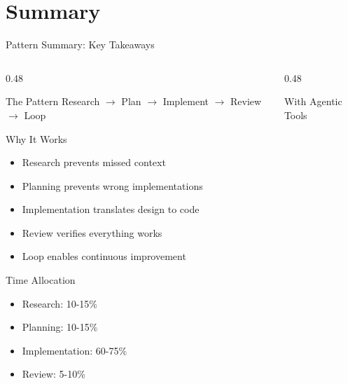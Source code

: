 \documentclass[aspectratio=169,10pt]{beamer}
\begin{document}
\section{Summary}

\begin{frame}{Pattern Summary: Key Takeaways}
    \begin{columns}[T]
        \begin{column}{0.48\textwidth}
            \begin{block}{The Pattern}
                Research $\rightarrow$ Plan $\rightarrow$ Implement $\rightarrow$ Review $\rightarrow$ Loop
            \end{block}
            \begin{block}{Why It Works}
                \begin{itemize}
                    \item Research prevents missed context
                    \item Planning prevents wrong implementations
                    \item Implementation translates design to code
                    \item Review verifies everything works
                    \item Loop enables continuous improvement
                \end{itemize}
            \end{block}
            \begin{block}{Time Allocation}
                \begin{itemize}
                    \item Research: 10-15\%
                    \item Planning: 10-15\%
                    \item Implementation: 60-75\%
                    \item Review: 5-10\%
                \end{itemize}
            \end{block}
        \end{column}
        \begin{column}{0.48\textwidth}
            \begin{block}{With Agentic Tools}
                \begin{itemize}

\end{itemize}
\end{block}
\end{column}
\end{columns}
\end{frame}
\end{document}
